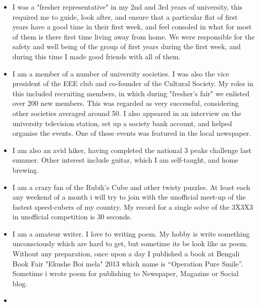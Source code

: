 \documentclass[11pt,a4paper,sans]{moderncv}        %
\begin{document}
\begin{itemize}

\item{I was a "fresher representative" in my 2nd and 3rd years of university, this required me to guide, look after, and ensure that a particular flat of first years have a good time in their first week, and feel consoled in what for most of them is there first time living away from home. We were responsible for the safety and well being of the group of first years during the first week, and during this time I made good friends with all of them.}

\vspace{6pt}

\item{I am a member of a number of university societies. I was also the vice president of the EEE club and co-founder of the Cultural Society. My roles in this included recruiting members, in which during "fresher's fair" we enlisted over 200 new members. This was regarded as very successful, considering other societies averaged around 50. I also appeared in an interview on the university television station, set up a society bank account, and helped organise the events. One of these events was featured in the local newspaper.}

\vspace{6pt}

\item{I am also an avid hiker, having completed the national 3 peaks challenge last summer. Other interest include guitar, which I am self-taught, and home brewing.}

\vspace{6pt}

\item{I am a crazy fan of the Rubik's Cube and other twisty puzzles. At least each any weekend of a month i will try to join with the unofficial meet-up of the fastest speed-cubers of my country.
My record for a single solve of the 3X3X3 in unofficial competition is 30 seconds.}

\vspace{6pt}

\item{I am a amateur writer. I love to writing poem. My hobby is write something unconsciously which are hard to get, but sometime its be look like as poem. Without any preparation, once upon a day I published a book at Bengali Book Fair "Ekushe Boi mela" 2013 which name is “Operation Pure Smile”. Sometime i wrote poem for publishing to Newspaper, Magazine or Social blog.}

\vspace{6pt}

\item{}

\end{itemize}
\end{document}
